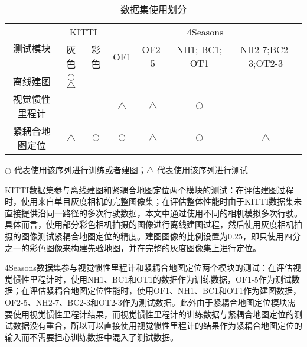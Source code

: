 \begin{table}
\centering
\caption{数据集使用划分}
\begin{tabular}{c|cc|cccc}
\toprule
\multirow{2}{*}{测试模块} & \multicolumn{2}{c|}{KITTI}               & \multicolumn{4}{c}{4Seasons}                                            \\ \cline{2-7} 
                  & 灰色                          & 彩色         & OF1              & OF2-5            & NH1; BC1; OT1 & NH2-7;BC2-3;OT2-3 \\ \midrule
离线建图 & {\color[HTML]{3166FF} $\bigcirc$}{\color[HTML]{FD6864}$\bigtriangleup$} &            &                  &                  &               &                   \\
视觉惯性里程计           &                             &            & {\color[HTML]{FD6864}$\bigtriangleup$} & {\color[HTML]{FD6864}$\bigtriangleup$} & {\color[HTML]{3166FF} $\bigcirc$}    &                   \\
紧耦合地图定位           & {\color[HTML]{FD6864}$\bigtriangleup$}           & {\color[HTML]{3166FF} $\bigcirc$} & {\color[HTML]{3166FF} $\bigcirc$}       & {\color[HTML]{FD6864}$\bigtriangleup$} & {\color[HTML]{3166FF} $\bigcirc$}    & {\color[HTML]{FD6864}$\bigtriangleup$}  \\ \bottomrule
\end{tabular}
\label{tab:dataset_usage}
\begin{tablenotes}
  \footnotesize
  \item {\color[HTML]{3166FF} $\bigcirc$} 代表使用该序列进行训练或者建图；{\color[HTML]{FD6864}$\bigtriangleup$} 代表使用该序列进行测试
\end{tablenotes}
\end{table}

KITTI数据集参与离线建图和紧耦合地图定位两个模块的测试：在评估建图过程时，使用来自单目灰度相机的完整图像集；在评估整体性能时由于KITTI数据集未直接提供沿同一路径的多次行驶数据，本文中通过使用不同的相机模拟多次行驶。具体而言，使用部分彩色相机拍摄的图像进行离线建图过程，然后使用灰度相机拍摄的图像测试紧耦合地图定位的精度。建图图像的比例设置为0.25，即只使用四分之一的彩色图像来构建先验地图，并在完整的灰度图像集上进行定位。

4Seasons数据集参与视觉惯性里程计和紧耦合地图定位两个模块的测试：在评估视觉惯性里程计时，使用NH1、BC1和OT1的数据作为训练数据，OF1-5作为测试数据；在评估紧耦合地图定位性能时，使用OF1、NH1、BC1和OT1作为建图数据，OF2-5、NH2-7、BC2-3和OT2-3作为测试数据。此外由于紧耦合地图定位模块需要使用视觉惯性里程计结果，而视觉惯性里程计的训练数据与紧耦合地图定位的测试数据没有重合，所以可以直接使用视觉惯性里程计的结果作为紧耦合地图定位的输入而不需要担心训练数据中混入了测试数据。


